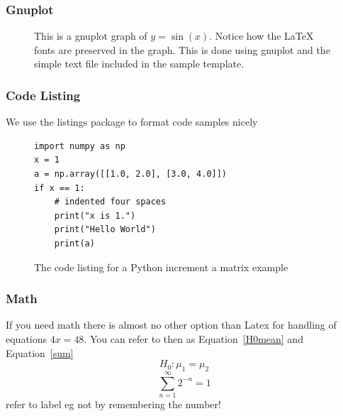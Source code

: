 \documentclass[screen, aspectratio=43]{beamer}
\begin{document}
\begin{frame}
  \frametitle{Gnuplot}

\begin{figure}[htp]  %
  \centering
  \scalebox{.7}{}
  \caption[An example graph.]{This is a gnuplot graph of $y=\sin(x)$. Notice how the \LaTeX{} fonts are preserved in the graph. This is done using gnuplot and the simple text file included in the sample template.}
  \label{fig:exgnuplotex}
\end{figure}

    \note{
  
    }

\end{frame}

\begin{frame}[fragile]
  \frametitle{Code Listing}
    We use the listings package to format code samples nicely
  \begin{figure}[tp] 
  \centering
\lstset{language=Python}
\begin{lstlisting}
import numpy as np
x = 1
a = np.array([[1.0, 2.0], [3.0, 4.0]])
if x == 1:
    # indented four spaces
    print("x is 1.")
    print("Hello World")
    print(a)
\end{lstlisting}
  \caption[Python code example]{The code listing for a Python increment a matrix example}
  \label{fig:PythonCode}
\end{figure}

    \note{
    }

\end{frame}

\begin{frame}
\frametitle{Math}
If you need math there is almost no other option than Latex for handling of equations $4x = 48 $. You can refer to then as Equation~\ref{H0mean} and Equation~\ref{sum}
\begin{equation} 
\label{H0mean}
    H_0 : \mu_1 = \mu_2
\end{equation}
\begin{equation} 
\label{sum}
    \sum_{n=1}^{\infty} 2^{-n} = 1
\end{equation}
refer to label eg \detokenize{\ref{H0mean}} not by remembering the number!
\end{frame}
\end{document}
